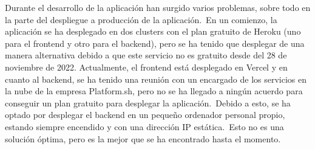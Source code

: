 
Durante el desarrollo de la aplicación han surgido varios problemas, sobre todo en la parte del despliegue a producción
de la aplicación.\ En un comienzo, la aplicación se ha desplegado en dos clusters con el plan gratuito de Heroku (uno
para el frontend y otro para el backend), pero se ha tenido que desplegar de una manera alternativa debido a que este
servicio no es gratuito desde del 28 de noviembre de 2022.
Actualmente, el frontend está desplegado en Vercel y en cuanto al backend, se ha tenido una reunión con un encargado
de los servicios en la nube de la empresa Platform.sh, pero no se ha llegado a ningún acuerdo para conseguir un plan
gratuito para desplegar la aplicación.\ Debido a esto, se ha optado por desplegar el backend en un pequeño ordenador
personal propio, estando siempre encendido y con una dirección IP estática.\ Esto no es una solución óptima, pero es
la mejor que se ha encontrado hasta el momento.
